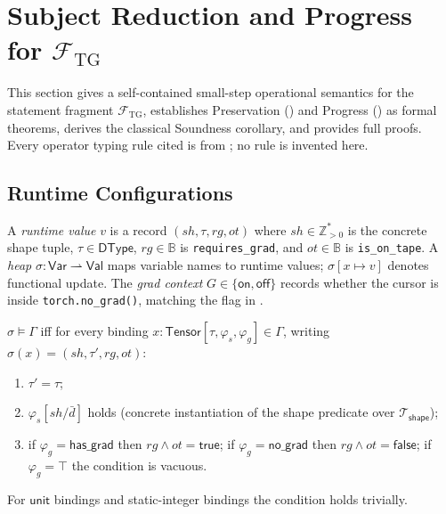
\providecommand{\llbracket}{[\![}
\providecommand{\rrbracket}{]\!]}

\section{Subject Reduction and Progress for
 \texorpdfstring{$\mathcal{F}_{\mathrm{TG}}$}{F-TG}}
\label{app:subject-reduction}

This section gives a self-contained small-step operational semantics for the
statement fragment $\mathcal{F}_{\mathrm{TG}}$, establishes Preservation
() and Progress () as formal theorems,
derives the classical Soundness corollary, and provides full proofs.
Every operator typing rule cited is from ;
no rule is invented here.

\subsection{Runtime Configurations}
\label{app:sos-configs}

A \emph{runtime value} $v$ is a record
$(\mathit{sh},\tau,\mathit{rg},\mathit{ot})$ where
$\mathit{sh}\in\mathbb{Z}_{>0}^{*}$ is the concrete shape tuple,
$\tau\in\mathsf{DType}$, $\mathit{rg}\in\mathbb{B}$ is
\texttt{requires\_grad}, and $\mathit{ot}\in\mathbb{B}$ is
\texttt{is\_on\_tape}.
A \emph{heap} $\sigma:\mathsf{Var}\rightharpoonup\mathsf{Val}$ maps variable
names to runtime values; $\sigma[x\mapsto v]$ denotes functional update.
The \emph{grad context} $G\in\{\mathsf{on},\mathsf{off}\}$ records whether
the cursor is inside \texttt{torch.no\_grad()}, matching the flag in
.

\begin{definition}
\label{def:heap-satisfaction}
$\sigma\models\Gamma$ iff for every binding
$x:\mathsf{Tensor}[\tau,\varphi_s,\varphi_g]\in\Gamma$,
writing $\sigma(x)=(\mathit{sh},\tau',\mathit{rg},\mathit{ot})$:
\begin{enumerate}
 \item $\tau'=\tau$;
 \item $\varphi_s[\mathit{sh}/\bar d]$ holds (concrete instantiation
 of the shape predicate over $\mathcal{T}_{\mathsf{shape}}$);
 \item if $\varphi_g=\mathsf{has\_grad}$ then $\mathit{rg}\wedge\mathit{ot}=\mathsf{true}$;
 if $\varphi_g=\mathsf{no\_grad}$ then $\mathit{rg}\wedge\mathit{ot}=\mathsf{false}$;
 if $\varphi_g=\top$ the condition is vacuous.
\end{enumerate}
For $\mathsf{unit}$ bindings and static-integer bindings the condition holds
trivially.
\end{definition}

